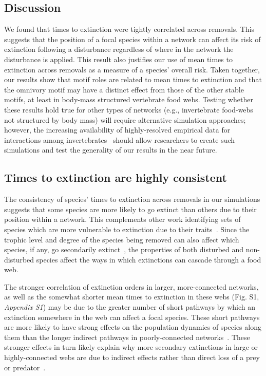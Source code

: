 \documentclass[12pt]{article}
\begin{document}
\begin{spacing}{2.0}
    
\section*{Discussion}

    We found that times to extinction were tightly correlated across removals. 
    This suggests that the position of a focal species within a network can affect its risk of extinction following a disturbance regardless of where in the network the disturbance is applied. This result also justifies our use of mean times to extinction across removals as a measure of a species' overall risk.
    Taken together, our results show that motif roles are related to mean times to extinction and that the omnivory motif may have a distinct effect from those of the other stable motifs, at least in body-mass structured vertebrate food webs.
    Testing whether these results hold true for other types of networks (e.g., invertebrate food-webs not structured by body mass) will require alternative simulation approaches; however, the increasing availability of highly-resolved empirical data for interactions among invertebrates~\citep{Waldner2012} should allow researchers to create such simulations and test the generality of our results in the near future.


 	\subsection*{Times to extinction are highly consistent}

		The consistency of species' times to extinction across removals in our simulations suggests that some species are more likely to go extinct than others due to their position within a network.
        This complements other work identifying sets of species which are more vulnerable to extinction due to their traits~\citep{Curtsdotter2011,Ryser2019}. 
		Since the trophic level and degree of the species being removed can also affect which species, if any, go secondarily extinct~\citep{Wootton2016a,Dunne2002}, the properties of both disturbed and non-disturbed species affect the ways in which extinctions can cascade through a food web.
		
		
		The stronger correlation of extinction orders in larger, more-connected networks, as well as the somewhat shorter mean times to extinction in these webs (Fig. S1, \emph{Appendix S1}) may be due to the greater number of short pathways by which an extinction somewhere in the web can affect a focal species. 
		These short pathways are more likely to have strong effects on the population dynamics of species along them than the longer indirect pathways in poorly-connected networks~\citep{Jordan2002,Jordan2006}.
		These stronger effects in turn likely explain why more secondary extinctions in large or highly-connected webs are due to indirect effects rather than direct loss of a prey or predator~\citep{Wootton2016a}. 



\end{spacing}
\end{document}
